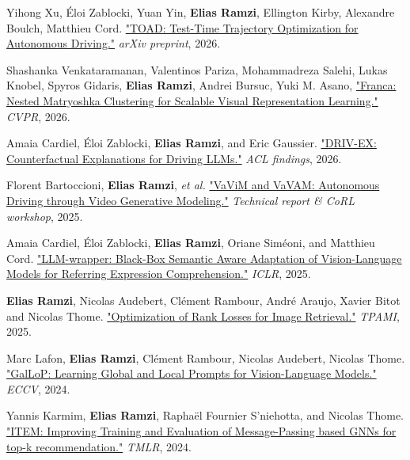 \documentclass[11pt,a4paper,roman]{moderncv}        %
\begin{document}
{{ \smallskip

Yihong Xu, {\'E}loi Zablocki, Yuan Yin, \textbf{Elias Ramzi}, Ellington Kirby, Alexandre Boulch, Matthieu Cord. \href{https://arxiv.org/abs/2606.07170}{"TOAD: Test-Time Trajectory Optimization for Autonomous Driving."} \textit{arXiv preprint}, 2026.

 \smallskip

Shashanka Venkataramanan, Valentinos Pariza, Mohammadreza Salehi, Lukas Knobel, Spyros Gidaris, \textbf{Elias Ramzi}, Andrei Bursuc, Yuki M. Asano, \href{https://arxiv.org/abs/2507.14137}{"Franca: Nested Matryoshka Clustering for Scalable Visual Representation Learning."} \textit{CVPR}, 2026.

 \smallskip

 Amaia Cardiel, {\'E}loi Zablocki, \textbf{Elias Ramzi}, and Eric Gaussier. \href{https://arxiv.org/abs/2603.00696}{"DRIV-EX: Counterfactual Explanations for Driving LLMs."} \textit{ACL findings}, 2026.

  \smallskip

 Florent Bartoccioni, \textbf{Elias Ramzi}, \textit{et al.} \href{https://arxiv.org/abs/2502.15672}{"VaViM and VaVAM: Autonomous Driving through Video Generative Modeling."} \textit{Technical report \& CoRL workshop}, 2025.

\smallskip

Amaia Cardiel, {\'E}loi Zablocki, \textbf{Elias Ramzi}, Oriane Sim{\'e}oni, and Matthieu Cord. \href{https://arxiv.org/abs/2409.11919}{"LLM-wrapper: Black-Box Semantic Aware Adaptation of Vision-Language Models for Referring Expression Comprehension."} \textit{ICLR}, 2025.

  \smallskip

     \textbf{Elias Ramzi}, Nicolas Audebert, Cl{\'e}ment Rambour, Andr{\'e} Araujo, Xavier Bitot and Nicolas Thome. \href{https://arxiv.org/abs/2309.08250}{"Optimization of Rank Losses for Image Retrieval."} \textit{TPAMI}, 2025.

\smallskip

 Marc Lafon, \textbf{Elias Ramzi}, Cl{\'e}ment Rambour, Nicolas Audebert, Nicolas Thome. \href{https://arxiv.org/abs/2407.01400}{"GalLoP: Learning Global and Local Prompts for Vision-Language Models."} \textit{ECCV}, 2024.

 \smallskip

Yannis Karmim, \textbf{Elias Ramzi}, Raphaël Fournier S’niehotta, and Nicolas Thome. \href{https://arxiv.org/abs/2407.07912}{"ITEM: Improving Training and Evaluation of Message-Passing based GNNs for top-k recommendation."} \textit{TMLR}, 2024.

}}
\end{document}
